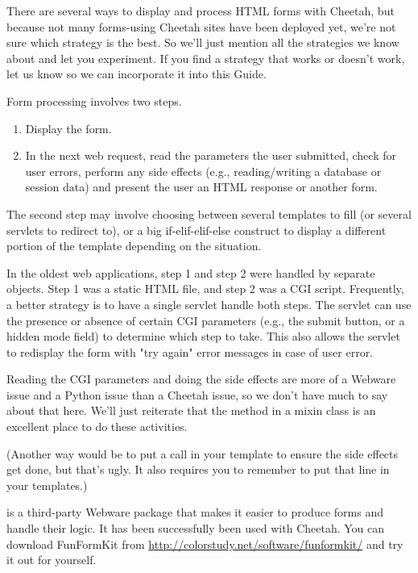 There are several ways to display and process HTML forms with Cheetah, but 
because not many forms-using Cheetah sites have been deployed yet, we're not
sure which strategy is the best.  So we'll just mention all the strategies we
know about and let you experiment.  If you find a strategy that works or doesn't
work, let us know so we can incorporate it into this Guide.

Form processing involves two steps.  
\begin{enumerate}
\item{} Display the form.  
\item{} In the next web request, read the parameters the user submitted,
check for user errors, perform any side effects (e.g., reading/writing a
database or session data) and present the user an HTML response or another
form.  
\end{enumerate}

The second step may involve choosing between several templates to fill (or
several servlets to redirect to), or a big if-elif-elif-else construct to
display a different portion of the template depending on the situation.

In the oldest web applications, step 1 and step 2 were handled by separate
objects.  Step 1 was a static HTML file, and step 2 was a CGI script.
Frequently, a better strategy is to have a single servlet handle both steps.
The servlet can use the presence or absence of certain CGI parameters
(e.g., the submit button, or a hidden mode field) to determine which step to
take.  This also allows the servlet to redisplay the form with "try again"
error messages in case of user error.  

Reading the CGI parameters and doing the side effects are more of a Webware 
issue and a Python issue than a Cheetah issue, so we don't have much to say
about that here.  We'll just reiterate that the  method in a
mixin class is an excellent place to do these activities.  

(Another way would be to put a  call in your
template to ensure the side effects get done, but that's ugly.  It also
requires you to remember to put that line in your templates.)

 is a third-party Webware package that makes it easier to
produce forms and handle their logic.  It has been successfully been used with
Cheetah.  You can download FunFormKit from
\url{http://colorstudy.net/software/funformkit/} and try it out for yourself.


